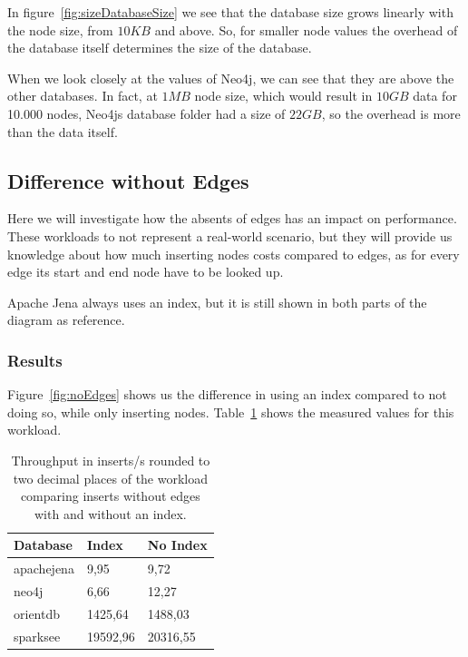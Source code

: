 In figure~\ref{fig:sizeDatabaseSize} we see that the database size grows linearly with the node size,
from $ 10KB $ and above.
So,
for smaller node values the overhead of the database itself determines the size of the database.

When we look closely at the values of Neo4j,
we can see that they are above the other databases.
In fact,
at $ 1MB $ node size,
which would result in $ 10GB $ data for 10.000 nodes,
Neo4js database folder had a size of $ 22GB $,
so the overhead is more than the data itself.

\subsection{Difference without Edges}
\label{ch:evaluation:se:differenceEdges}
Here we will investigate how the absents of edges has an impact on performance.
These workloads to not represent a real-world scenario,
but they will provide us knowledge about how much inserting nodes costs compared to edges,
as for every edge its start and end node have to be looked up.

Apache Jena always uses an index,
but it is still shown in both parts of the diagram as reference.

\subsubsection{Results}
Figure~\ref{fig:noEdges} shows us the difference in using an index compared to not doing so,
while only inserting nodes.
Table~\ref{tab:noEdges} shows the measured values for this workload.

\begin{table}[h!]
  \begin{minipage}{\textwidth}
    \centering
    \begin{tabular}{ | l | l | l | }
      \hline
      Database & Index & No Index \\ \hline
      apachejena & 9,95 & 9,72 \\ \hline
      neo4j & 6,66 & 12,27 \\ \hline
      orientdb & 1425,64 & 1488,03 \\ \hline
      sparksee & 19592,96 & 20316,55 \\ \hline
    \end{tabular}
  \end{minipage}
  \caption{Throughput in inserts/s rounded to two decimal places of the workload comparing inserts without edges with and without an index.}
  \label{tab:noEdges}
\end{table}

